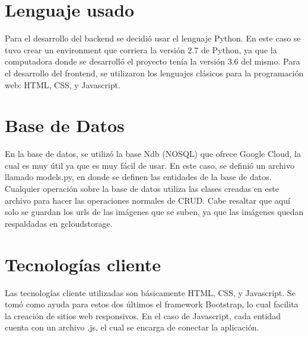 \documentclass{article}
\begin{document}
	
	\section{Lenguaje usado}
	Para el desarrollo del backend se decidió usar el lenguaje Python. En este caso se tuvo crear un environment que corriera la versión 2.7 de Python, ya que la computadora donde se desarrolló el proyecto tenía la versión 3.6 del mismo.
	\linebreak
	Para el desarrollo del frontend, se utilizaron los lenguajes clásicos para la programación web: HTML, CSS, y Javascript.
	
	
	\section{Base de Datos}
	En la base de datos, se utilizó la base Ndb (NOSQL) que ofrece Google Cloud, la cual es muy útil ya que es muy fácil de usar.
	\linebreak
	En este caso, se definió un archivo llamado models.py, en donde se definen las entidades de la base de datos. Cualquier operación sobre la base de datos utiliza las clases creadas en este archivo para  hacer las operaciones normales de CRUD.
	\linebreak
	Cabe resaltar que aquí solo se guardan los urls de las imágenes que se suben, ya que las imágenes quedan respaldadas en gcloudstorage.
	
	
	\section{Tecnologías cliente}
	Las tecnologías cliente utilizadas son básicamente HTML, CSS, y Javascript. Se tomó como ayuda para estos dos últimos el framework Bootstrap, lo cual facilita la creación de sitios web responsivos.
	\linebreak
	En el caso de Javascript, cada entidad cuenta con un archivo .js, el cual se encarga de conectar la aplicación. 
\end{document}
